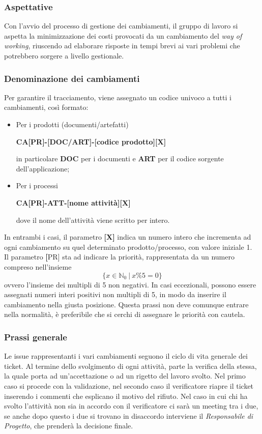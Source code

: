 \subsubsection{Aspettative}
Con l'avvio del processo di gestione dei cambiamenti, il gruppo di lavoro si aspetta la minimizzazione dei costi provocati da un cambiamento
del \textit{way of working}, riuscendo ad elaborare risposte in tempi brevi ai vari problemi che potrebbero sorgere a livello gestionale.

\subsubsection{Denominazione dei cambiamenti}
Per garantire il tracciamento, viene assegnato un codice univoco a tutti i cambiamenti, così formato:
\begin{itemize}
    \item Per i prodotti (documenti/artefatti)
        \begin{center}
            \textbf{CA[PR]-[DOC/ART]-[codice prodotto][X]}
        \end{center}
        in particolare \textbf{DOC} per i documenti e \textbf{ART} per il codice sorgente dell'applicazione;
    \item Per i processi
        \begin{center}
            \textbf{CA[PR]-ATT-[nome attività][X]}
        \end{center}
        dove il nome dell'attività viene scritto per intero.
\end{itemize}
In entrambi i casi, il parametro \textbf{[X]} indica un numero intero che incrementa ad ogni cambiamento su quel determinato prodotto/processo,
 con valore iniziale 1.\\
 Il parametro \textbf[PR] sta ad indicare la priorità, rappresentata da un numero compreso nell'insieme
 \[\{x \in \mathbb{N}_0 \ | \  x \% 5 = 0 \} \]
 ovvero l'insieme dei multipli di 5 non negativi. In casi eccezionali, possono essere assegnati numeri interi positivi non multipli di 5,
 in modo da inserire il cambiamento nella giusta posizione. Questa prassi non deve comunque entrare nella normalità,  è preferibile che si cerchi
 di assegnare le priorità con cautela.

 \subsubsection{Prassi generale}
 Le issue rappresentanti i vari cambiamenti seguono il ciclo di vita generale dei ticket.
 Al termine dello svolgimento di ogni attività,  parte la verifica della stessa,  la quale porta ad un'accettazione o ad un rigetto
del lavoro svolto.  Nel primo caso si procede con la validazione, nel secondo caso il verificatore riapre il ticket inserendo i commenti
che esplicano il motivo del rifiuto. Nel caso in cui chi ha svolto l'attività non sia in accordo con il verificatore ci sarà un meeting tra i due, se anche
dopo questo i due si trovano in disaccordo interviene il \textit{Responsabile di Progetto}, che prenderà la decisione finale.

